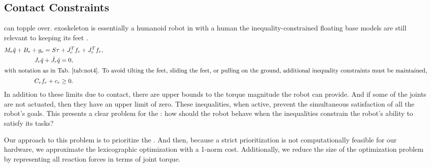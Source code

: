 \subsection{Contact Constraints}
  can topple over.
 exoskeleton is essentially a humanoid robot \ta{(}in  with a human\ta{),} the inequality-constrained floating base models \cite{KoolenEA2016IJHR,KimEA2016TRO,KimJorgensenHwangSentis2018Humanoids,MungaiGrizzle2020Access} are still relevant to keeping its feet .
\begin{gather}
M_e \ddot q + B_e + g_e = S \tau + J_c^T f_c + J_r^T f_r,\label{eq:physical_dynamics_1}\\
J_r \ddot q + \dot J_r \dot q = 0,\label{eq:physical_dyamics_2}\\
\shortintertext{\ta{with notation as in  Tab.~\ref{tab:not4}. \ta{To avoid tilting the feet, sliding the \ta{feet}, or pulling on the ground, additional inequality constraints must be maintained}},}
C_r f_r + c_r \geq 0.\label{eq:contact_inequalities}
\end{gather}
 In addition to these limits due to contact, there are upper bounds to the torque magnitude the robot can provide. And if some of the joints are not actuated, then they have an upper limit of zero. These inequalities, when active, prevent the simultaneous satisfaction of all the robot's goals. This presents a clear problem for the : how should the robot behave when the inequalities constrain the robot's ability to satisfy its tasks?


Our approach to this problem is to prioritize the . And then, because a strict prioritization is not computationally feasible for our hardware, we approximate the lexicographic optimization with a 1-norm cost. Additionally, we reduce the size of the optimization problem by representing all reaction forces in terms of joint torque. 


